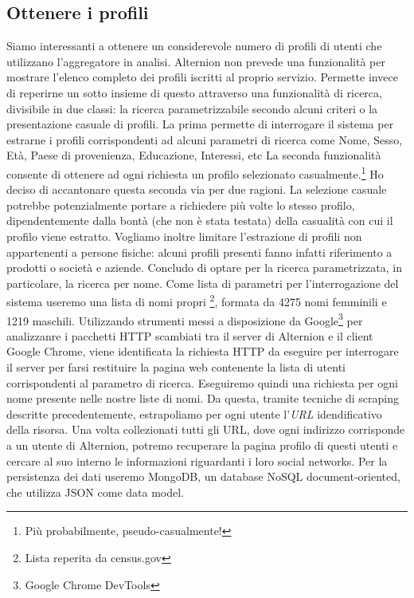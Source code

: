 \subsection{Ottenere i profili}
Siamo interessanti a ottenere un considerevole numero di profili di utenti che utilizzano l'aggregatore in analisi. Alternion non prevede una funzionalità per mostrare l'elenco completo dei profili iscritti al proprio servizio. Permette invece di reperirne un sotto insieme di questo attraverso una funzionalità di ricerca, divisibile in due classi: la ricerca parametrizzabile secondo alcuni criteri o la presentazione casuale di profili. La prima permette di interrogare il sistema per estrarne i profili corrispondenti ad alcuni parametri di ricerca come Nome, Sesso, Età, Paese di provenienza, Educazione, Interessi, etc La seconda funzionalità consente di ottenere ad ogni richiesta un profilo selezionato casualmente.\footnote{Più probabilmente, pseudo-casualmente!} Ho deciso di accantonare questa seconda via per due ragioni. La selezione casuale potrebbe potenzialmente portare a richiedere più volte lo stesso profilo, dipendentemente dalla bontà (che non è stata testata) della casualità con cui il profilo viene estratto. Vogliamo inoltre limitare l'estrazione di profili non appartenenti a persone fisiche: alcuni profili presenti fanno infatti riferimento a prodotti o società e aziende. Concludo di optare per la ricerca parametrizzata, in particolare, la ricerca per nome. Come lista di parametri per l'interrogazione del sistema useremo una lista di nomi propri \footnote{Lista reperita da census.gov}, formata da 4275 nomi femminili e 1219 maschili. Utilizzando strumenti messi a disposizione da Google\footnote{Google Chrome DevTools} per analizzanre i pacchetti HTTP scambiati tra il server di Alternion e il client Google Chrome, viene identificata la richiesta HTTP da eseguire per interrogare il server per farsi restituire la pagina web contenente la lista di utenti corrispondenti al parametro di ricerca. Eseguiremo quindi una richiesta per ogni nome presente nelle nostre liste di nomi. Da questa, tramite tecniche di scraping descritte precedentemente, estrapoliamo per ogni utente l'\textit{URL} idendificativo della risorsa. Una volta collezionati tutti gli URL, dove ogni indirizzo corrisponde a un utente di Alternion, potremo recuperare la pagina profilo di questi utenti e cercare al suo interno le informazioni riguardanti i loro social networks. Per la persistenza dei dati useremo MongoDB, un database NoSQL document-oriented, che utilizza JSON come data model.
